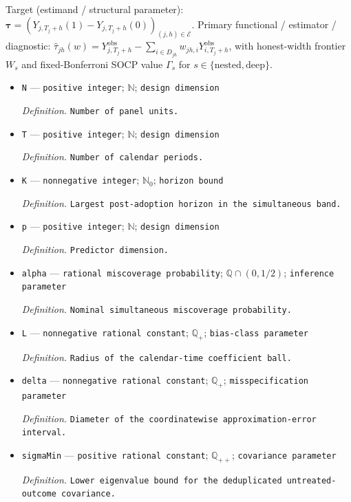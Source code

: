 \documentclass{article}
\begin{document}
Target (estimand / structural parameter): \(\boldsymbol{\tau}=(Y_{j,T_j+h}(1)-Y_{j,T_j+h}(0))_{(j,h)\in\mathcal E}\).
Primary functional / estimator / diagnostic: \(\widehat\tau_{jh}(w)=Y^{\mathrm{obs}}_{j,T_j+h}-\sum_{i\in D_{jh}}w_{jh,i}Y^{\mathrm{obs}}_{i,T_j+h}\), with honest-width frontier \(W_s\) and fixed-Bonferroni SOCP value \(\Gamma_s\) for \(s\in\{\mathrm{nested},\mathrm{deep}\}\).
\begin{itemize}
  \item \texttt{N} --- \texttt{positive integer}; \(\mathbb N\); \texttt{design dimension}
  \par\smallskip\noindent\emph{Definition.} \texttt{Number of panel units.}
  \item \texttt{T} --- \texttt{positive integer}; \(\mathbb N\); \texttt{design dimension}
  \par\smallskip\noindent\emph{Definition.} \texttt{Number of calendar periods.}
  \item \texttt{K} --- \texttt{nonnegative integer}; \(\mathbb N_0\); \texttt{horizon bound}
  \par\smallskip\noindent\emph{Definition.} \texttt{Largest post-\allowbreak{}adoption horizon in the simultaneous band.}
  \item \texttt{p} --- \texttt{positive integer}; \(\mathbb N\); \texttt{design dimension}
  \par\smallskip\noindent\emph{Definition.} \texttt{Predictor dimension.}
  \item \texttt{alpha} --- \texttt{rational miscoverage probability}; \(\mathbb Q\cap(0,1/2)\); \texttt{inference parameter}
  \par\smallskip\noindent\emph{Definition.} \texttt{Nominal simultaneous miscoverage probability.}
  \item \texttt{L} --- \texttt{nonnegative rational constant}; \(\mathbb Q_+\); \texttt{bias-\allowbreak{}class parameter}
  \par\smallskip\noindent\emph{Definition.} \texttt{Radius of the calendar-\allowbreak{}time coefficient ball.}
  \item \texttt{delta} --- \texttt{nonnegative rational constant}; \(\mathbb Q_+\); \texttt{misspecification parameter}
  \par\smallskip\noindent\emph{Definition.} \texttt{Diameter of the coordinatewise approximation-\allowbreak{}error interval.}
  \item \texttt{sigmaMin} --- \texttt{positive rational constant}; \(\mathbb Q_{++}\); \texttt{covariance parameter}
  \par\smallskip\noindent\emph{Definition.} \texttt{Lower eigenvalue bound for the deduplicated untreated-\allowbreak{}outcome covariance.}

\end{itemize}
\end{document}
